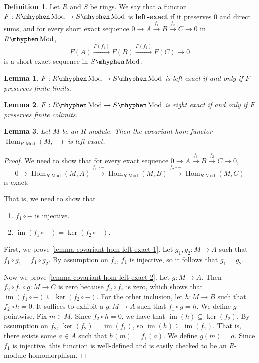 \documentclass[11pt]{article}
\newcommand{\Hom}{\operatorname{Hom}}
\newcommand{\RHom}[3]{\Hom_{{#1}\text{-Mod}}({#2}, {#3})}
\newcommand{\im}{\operatorname{im}}
\renewcommand{\ker}{\operatorname{ker}}
\newcommand{\Mod}{\mhyphen\operatorname{Mod}}
\theoremstyle{plain}
\newtheorem{lemma}{Lemma}[section]
\theoremstyle{definition}
\newtheorem{definition}{Definition}[section]
\begin{document}
\begin{definition} \label{def-right-exact}
  Let \(R\) and \(S\) be rings. We say that a functor \(F : R\Mod \to S\Mod\) is \textbf{left-exact} if it preserves \(0\) and direct sums, and for every short exact sequence \(0 \to A \overset{f_1}{\to} B \overset{f_2}{\to} C \to 0\) in \(R\Mod\),
  \[F(A) \overset{F(f_1)}{\to} F(B) \overset{F(f_2)}{\to} F(C) \to 0\]
  is a short exact sequence in \(S\Mod\).
\end{definition}

\begin{lemma}\label{lemma-left-exact-finite-limits}
  \(F : R\Mod \to S\Mod\) is left exact if and only if \(F\) preserves finite limits.
\end{lemma}

\begin{lemma}\label{lemma-right-exact-finite-limits}
  \(F : R\Mod \to S\Mod\) is right exact if and only if \(F\) preserves finite colimits.
\end{lemma}

\begin{lemma}\label{lemma-covariant-hom-left-exact}
  Let \(M\) be an \(R\)-module. Then the covariant hom-functor \(\RHom{R}{M}{-}\) is left-exact.
\end{lemma}

\begin{proof}
  We need to show that for every exact sequence \(0 \to A \overset{f_1}{\to} B \overset{f_2}{\to} C \to 0\),
  \[0 \to \RHom{R}{M}{A} \overset{f_1 \circ -}{\to} \RHom{R}{M}{B} \overset{f_2 \circ -}{\to} \RHom{R}{M}{C}\]
  is exact.

  That is, we need to show that
  \begin{enumerate}
  \item \label{lemma-covariant-hom-left-exact-1}\(f_1 \circ -\) is injective.
  \item \label{lemma-covariant-hom-left-exact-2} \(\im(f_1 \circ -) = \ker(f_2 \circ -)\).
  \end{enumerate}

First, we prove  \ref{lemma-covariant-hom-left-exact-1}.
    Let \(g_1, g_2 : M \to A\) such that \(f_1 \circ g_1 = f_1 \circ g_2\). By assumption on \(f_1\), \(f_1\) is injective, so it follows that \(g_1 = g_2\).

Now we prove \ref{lemma-covariant-hom-left-exact-2}.
    Let \(g : M \to A\). Then \(f_2 \circ f_1 \circ g : M \to C\) is zero because \(f_2 \circ f_1\) is zero, which shows that \(\im(f_1 \circ -) \subseteq \ker(f_2 \circ -)\). For the other inclusion, let \(h : M \to B\)  such that \(f_2 \circ h = 0\). It suffices to exhibit a \(g : M \to A\) such that \(f_1 \circ g = h\). We define \(g\) pointwise. Fix \(m \in M\). Since \(f_2 \circ h = 0\), we have that \(\im(h) \subseteq \ker(f_2)\). By assumption on \(f_2\), \(\ker(f_2) = \im(f_1)\), so \(\im(h) \subseteq \im(f_1)\). That is, there exists some \(a \in A\) such that \(h(m) = f_1(a)\). We define \(g(m) = a\). Since \(f_1\) is injective, this function is well-defined and is easily checked to be an \(R\)-module homomorphism.

  \end{proof}
\end{document}
